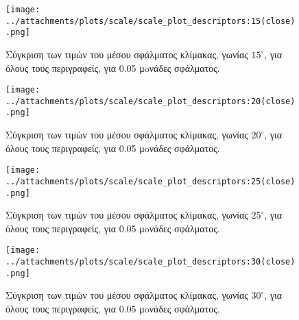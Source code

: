  \newpage
 
 \begin{figure}[ht!]
\begin{minipage}[b]{1.0\linewidth}
\centering
\texttt{[image: ../attachments/plots/scale/scale\_plot\_descriptors:15(close).png]}
\caption{Σύγκριση των τιμών του μέσου σφάλματος κλίμακας, γωνίας $15^{\circ}$, για όλους τους περιγραφείς, για 0.05 μoνάδες σφάλματος.}
\label{fig:plot_angle_des_15_low}
\end{minipage}
\end{figure} 
\begin{figure}[ht!]
\begin{minipage}[b]{1.0\linewidth}
\centering
\texttt{[image: ../attachments/plots/scale/scale\_plot\_descriptors:20(close).png]}
\caption{Σύγκριση των τιμών του μέσου σφάλματος κλίμακας, γωνίας $20^{\circ}$, για όλους τους περιγραφείς, για 0.05 μoνάδες σφάλματος.}
\label{fig:plot_angle_des_20_low}
\end{minipage}

 \end{figure} 
 
 \newpage
 
 \begin{figure}[ht!]
\begin{minipage}[b]{1.0\linewidth}
\centering
\texttt{[image: ../attachments/plots/scale/scale\_plot\_descriptors:25(close).png]}
\caption{Σύγκριση των τιμών του μέσου σφάλματος κλίμακας, γωνίας $25^{\circ}$, για όλους τους περιγραφείς, για 0.05 μoνάδες σφάλματος.}
\label{fig:plot_angle_des_25_low}
\end{minipage}
\end{figure} 
\begin{figure}[ht!]
\begin{minipage}[b]{1.0\linewidth}
\centering
\texttt{[image: ../attachments/plots/scale/scale\_plot\_descriptors:30(close).png]}
\caption{Σύγκριση των τιμών του μέσου σφάλματος κλίμακας, γωνίας $30^{\circ}$, για όλους τους περιγραφείς, για 0.05 μoνάδες σφάλματος.}
\label{fig:plot_angle_des_30_low}
\end{minipage}

 \end{figure} 
 
 \newpage
 
